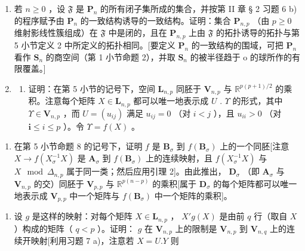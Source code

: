 \begin{enumerate}
\def\labelenumi{\arabic{enumi})}
\setcounter{enumi}{5}
\item
  若 \(n \geqslant 0\) ，设 \(\mathfrak{F}\) 是 \(\mathbf{P}_n\) 的所有闭子集所成的集合，并按第 II 章 § 2 习题 6 b) 的程序赋予由 \(\mathbf{P}_n\) 的一致结构诱导的一致结构。证明：集合 \(\mathbf{P}_{n,p}\) （由 \(p \geqslant 0\) 维射影线性簇组成）在 \(\mathfrak{F}\) 中是闭的，且在 \(\mathbf{P}_{n,p}\) 上由 \(\mathfrak{F}\) 的拓扑诱导的拓扑与第 5 小节定义 2 中所定义的拓扑相同。{[}要定义 \(\mathbf{P}_n\) 的一致结构的围域，可把 \(\mathbf{P}_n\) 看作 \(\mathbf{S}_n\) 的商空间（第 1 小节命题 2），并取 \(\mathbf{S}_n\) 的被半径趋于 o 的球所作的有限覆盖。{]}
\item
  \begin{enumerate}
  \def\labelenumii{\alph{enumii})}
  \tightlist
  \item
    证明：在第 5 小节的记号下，空间 \(\mathbf{L}_{n,p}\) 同胚于 \(\mathbf{V}_{n,p}\) 与 \(\mathbb{R}^{p(p+1)/2}\) 的乘积。注意每个矩阵 \(X\in\mathbf{L}_{n,p}\) 都可以唯一地表示成 \(U\) . \(\Upsilon\) 的形式，其中 \(\Upsilon\in\mathbf{V}_{n,p}\) ，而 \(U=(u_{ij})\) 满足 \(u_{ij}=0\) （对 \(i<j\) ），且 \(u_{ii}>0\) （对 \(\mathbf{i}\leqslant i\leqslant p\) ）。令 \(\Upsilon=f(X)\) 。
  \end{enumerate}
\end{enumerate}

\begin{enumerate}
\def\labelenumi{\alph{enumi})}
\setcounter{enumi}{1}
\tightlist
\item
  在第 5 小节命题 8 的记号下，证明 \(f\) 是 \(\mathbf{B}_{\sigma}\) 到 \(f(\mathbf{B}_{\sigma})\) 上的一个同胚{[}注意 \(X \to f(X_{\sigma}^{-1}X)\) 是 \(\mathbf{A}_{\sigma}\) 到 \(f(\mathbf{B}_{\sigma})\) 上的连续映射，且 \(f(X_{\sigma}^{-1}X)\) 与 \(X \mod \Delta_{n,p}\) 属于同一类；然后应用引理 2{]}。由此推出， \(\mathbf{D}_{\sigma}\) （即 \(\mathbf{A}_{\sigma}\) 与 \(\mathbf{V}_{n,p}\) 的交）同胚于 \(\mathbf{V}_{p,p}\) 与 \(\mathbb{R}^{p(n - p)}\) 的乘积{[}属于 \(\mathbf{D}_{\sigma}\) 的每个矩阵都可以唯一地表示成 \(\mathbf{V}_{p,p}\) 中一个矩阵与 \(f(\mathbf{B}_{\sigma})\) 中一个矩阵的乘积{]}。
\end{enumerate}

\begin{enumerate}
\def\labelenumi{\arabic{enumi})}
\setcounter{enumi}{7}
\tightlist
\item
  设 \(g\) 是这样的映射：对每个矩阵 \(X \in \mathbf{L}_{n,p}\) ， \(X'g(X)\) 是由前 \(q\) 行（取自 \(X\) ）构成的矩阵（ \(q < p\) ）。证明： \(g\) 在 \(\mathbf{V}_{n,p}\) 上的限制是 \(\mathbf{V}_{n,p}\) 到 \(\mathbf{V}_{n,q}\) 上的连续开映射{[}利用习题 7 a)，注意若 \(X = U.Y\) 则
\end{enumerate}

